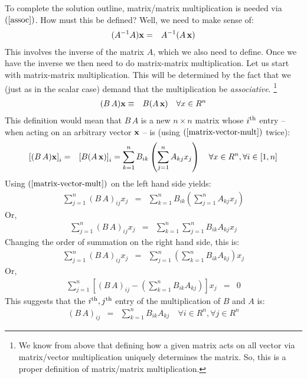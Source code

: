 \documentclass{article}
\begin{document}
To complete the solution outline, matrix/matrix multiplication is needed
via $(\ref{assoc})$. How must this be defined?
Well, we need to make sense of:
\begin{eqnarray}
  (A^{-1} A) {\bf x} & = & A^{-1} (A \, {\bf x}) 
\end{eqnarray}
This involves the inverse of the matrix $A$, which we also need to define. Once
we have the inverse we then need to do matrix-matrix multiplication.
Let us start with matrix-matrix multiplication.
This will be determined by the fact that we (just as in the scalar case) demand that the multiplication
be {\em associative\/}.
\footnote{We know from above that defining how a given matrix acts on all vector
  via matrix/vector multiplication uniquely determines the matrix. So, this is a proper definition of matrix/matrix multiplication.}
\begin{eqnarray}
    (B \, A) {\bf x} & \equiv & B (A \, {\bf x}) \quad \forall x \in R^n
\end{eqnarray}
This definition would mean that $B \, A$ is a new $n \times n$ matrix whose
$i^{\rm th}$ entry -- when acting on an arbitrary vector ${\bf x}$ --
is (using $(\ref{matrix-vector-mult})$ twice):
\begin{eqnarray}
    \left[(B \, A) {\bf x}\right]_i &  = & \left[B (A \, {\bf x})\right]_i = \sum_{k=1}^n B_{ik} \left(\sum_{j=1}^n A_{kj} x_j\right) \quad \forall x \in R^n, \forall i \in [1,n]
\end{eqnarray}
Using $(\ref{matrix-vector-mult})$ on the left hand side yields:
\begin{eqnarray}
  \sum_{j=1}^n (B \, A)_{ij} x_j &  = & \sum_{k=1}^n B_{ik} \left(\sum_{j=1}^n A_{kj} x_j\right)
\end{eqnarray}
Or,
\begin{eqnarray}
  \sum_{j=1}^n (B \, A)_{ij} x_j &  = & \sum_{k=1}^n \sum_{j=1}^n B_{ik} A_{kj} x_j
\end{eqnarray}
Changing the order of summation on the right hand side, this is:
\begin{eqnarray}
  \sum_{j=1}^n (B \, A)_{ij} x_j &  = & \sum_{j=1}^n \left(\sum_{k=1}^n B_{ik} A_{kj}\right) x_j \label{matrix-matrix-deriv}
\end{eqnarray}
Or,
\begin{eqnarray}
    \sum_{j=1}^n \left[ (B \, A)_{ij} - \left(\sum_{k=1}^n B_{ik} A_{kj}\right)\right] x_j & = & 0\label{matrix-matrix-deriv-2}
\end{eqnarray}
This suggests that the $i^{\rm th}, j^{\rm th}$ entry of the multiplication of $B$ and $A$ is:
\begin{eqnarray}
    (B \, A)_{ij} & = & \sum_{k=1}^n B_{ik} A_{kj} \label{matrix-matrix-mult} \quad \forall i \in R^n, \forall j \in R^n
\end{eqnarray}
\end{document}
